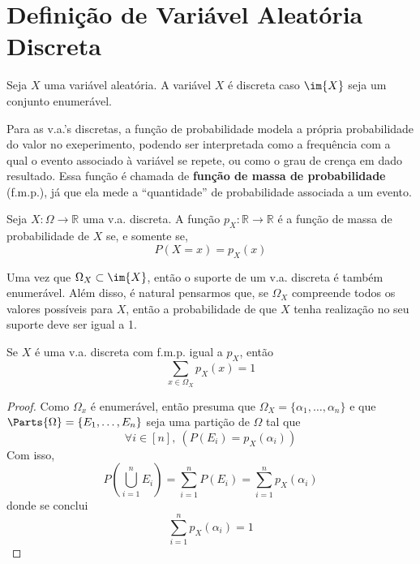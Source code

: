 \section{Definição de Variável Aleatória Discreta}

\begin{def:variavel discreta}
Seja $X$ uma variável aleatória. A variável $X$ é discreta caso $\im{X}$ seja um conjunto
enumerável.
\end{def:variavel discreta}

Para as v.a.'s discretas, a função de probabilidade modela a própria probabilidade
do valor no exeperimento, podendo ser interpretada como a frequência com a qual o evento
associado à variável se repete, ou como o grau de crença em dado resultado.
Essa função é chamada de \textbf{função de massa de probabilidade} (f.m.p.), já que ela
mede a ``quantidade'' de probabilidade associada a um evento.

\begin{def:fmp}
Seja $X: \Omega \to \mathbb{R}$ uma v.a. discreta. A função $p_X: \mathbb{R} \to \mathbb{R}$
é a função de massa de probabilidade de $X$ se, e somente se,
\[
	P(X = x) = p_X(x)
\]
\end{def:fmp}

Uma vez que $\Omega_X \subset \im{X}$, então o suporte de um v.a. discreta é também
enumerável. Além disso, é natural pensarmos que, se $\Omega_X$ compreende todos os valores
possíveis para $X$, então a probabilidade de que $X$ tenha realização no seu suporte deve
ser igual a 1.

\begin{prop:fmp suporte}
Se $X$ é uma v.a. discreta com f.m.p. igual a $p_X$, então
\[
	\sum_{x \in \Omega_X} p_X(x) = 1
\]
\begin{proof}
	Como $\Omega_x$ é enumerável, então presuma que $\Omega_X = \{\alpha_1, \ldots, \alpha_n\}$
	e que $\Parts{\Omega} = \{E_1, \ldots, E_n\}$ seja uma partição de $\Omega$ tal que
	\[
		\forall i \in [n],\ (P(E_i) = p_X(\alpha_i))
	\]
	Com isso,
	\[
		P\left(\bigcup_{i=1}^n E_i\right) =
		\sum_{i = 1}^n P(E_i) =
		\sum_{i = 1}^n p_X(\alpha_i)
	\]
	donde se conclui
	\[
		\sum_{i = 1}^n p_X(\alpha_i) = 1
	\]
\end{proof}
\end{prop:fmp suporte}
